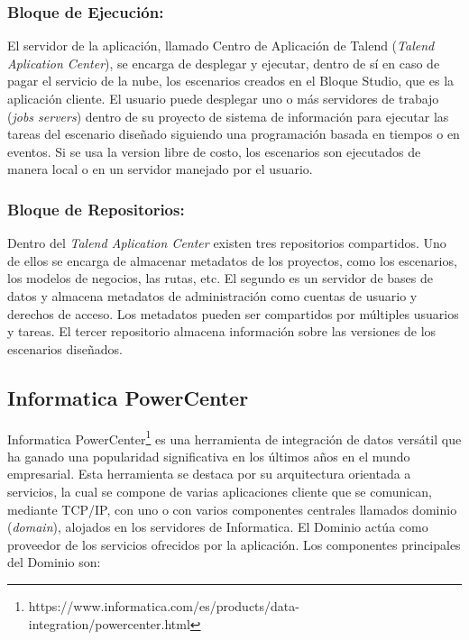 \subsubsection{Bloque de Ejecución:}

El servidor de la aplicación, llamado Centro de Aplicaci\'on de Talend (\emph{Talend Aplication Center}), 
se encarga de desplegar y ejecutar, dentro de s\'i en caso de pagar el 
servicio de la nube, los escenarios creados 
en el Bloque Studio, que es la aplicación cliente. El usuario puede desplegar uno o m\'as servidores de trabajo  
(\emph{jobs servers}) dentro de su proyecto de sistema de información para ejecutar las tareas del escenario diseñado 
siguiendo una programación basada en tiempos o en eventos. Si se usa la version libre de costo, los escenarios son 
ejecutados de manera local o en un servidor manejado por el usuario.

\subsubsection{Bloque de Repositorios:}

Dentro del \emph{Talend Aplication Center} existen tres repositorios compartidos. Uno de ellos se encarga de almacenar metadatos 
de los proyectos, como los escenarios, los modelos de negocios, las rutas, etc. 
El segundo es un servidor de bases de datos y almacena metadatos de administraci\'on como cuentas de usuario y derechos de 
acceso. Los metadatos pueden ser compartidos por múltiples usuarios y tareas. El tercer repositorio almacena informaci\'on 
sobre las versiones de los escenarios diseñados.





\subsection{Informatica PowerCenter}

Informatica PowerCenter\footnote{https://www.informatica.com/es/products/data-integration/powercenter.html} es una herramienta de integración de datos versátil que ha ganado una popularidad significativa 
en los últimos años en el mundo empresarial. Esta herramienta se destaca por su arquitectura orientada a servicios, 
la cual se compone de varias aplicaciones cliente que se comunican, mediante TCP/IP, con uno o con varios componentes 
centrales llamados dominio (\emph{domain}), alojados en los servidores de Informatica. El Dominio actúa como proveedor de los 
servicios ofrecidos por la aplicación. Los componentes principales del Dominio son\cite{malewar2017learning}: 

